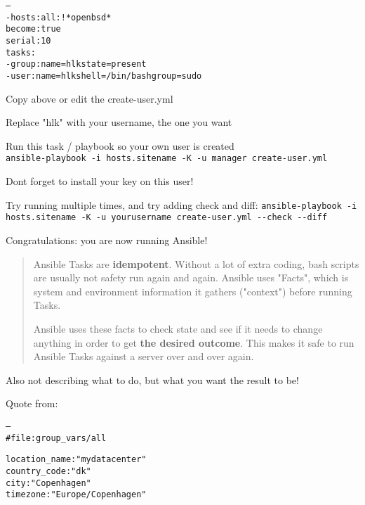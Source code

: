 \documentclass[18pt,landscape,a4paper,footrule]{foils}
\begin{document}

\begin{alltt}
---
- hosts: all:!*openbsd*
  become: true
  serial: 10
tasks:
  - group: name=hlk state=present
  - user: name=hlk shell=/bin/bash group=sudo
\end{alltt}

\begin{list2}
\item Copy above or edit the create-user.yml
\item Replace "hlk" with your username, the one you want
\item Run this task / playbook so your own user is created\\
\verb+ansible-playbook -i hosts.sitename -K -u manager create-user.yml+
\item Dont forget to install your key on this user!
\item Try running multiple times, and try adding check and diff:
\verb+ansible-playbook -i hosts.sitename -K -u yourusername create-user.yml --check --diff+
\item Congratulations: you are now running Ansible!
\end{list2}



\begin{quote}
Ansible Tasks are {\bf idempotent}. Without a lot of extra coding, bash scripts are usually not safety run again and again. Ansible uses "Facts", which is system and environment information it gathers ("context") before running Tasks.

Ansible uses these facts to check state and see if it needs to change anything in order to get {\bf the desired outcome}. This makes it safe to run Ansible Tasks against a server over and over again.
\end{quote}

Also not describing what to do, but what you want the result to be!

Quote from:\\


\begin{alltt}
---
# file: group_vars/all

location_name : "mydatacenter"
country_code : "dk"
city : "Copenhagen"
timezone : "Europe/Copenhagen"
\end{alltt}
\end{document}
